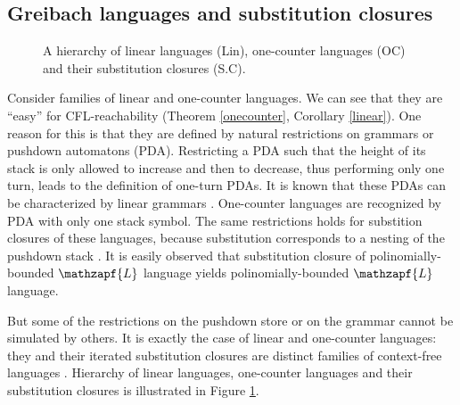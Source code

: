 \subsection{Greibach languages and substitution closures}
\begin{figure}
\centering
{}
\caption{A hierarchy of linear languages (Lin), one-counter languages (OC) and their substitution closures (S.C).}
\label{hierarchy}      
\end{figure}
Consider families of linear and one-counter languages. We can see that they are ``easy'' for CFL-reachability (Theorem \ref{onecounter}, Corollary \ref{linear}). One reason for this is that they are defined by natural restrictions on grammars or pushdown automatons (PDA). Restricting a PDA such that the height of its stack is only allowed to increase and then to decrease, thus performing only one turn, leads to the definition of one-turn PDAs. It is known that these PDAs can be characterized by linear grammars \cite{KUTRIB20072152}. One-counter languages are recognized by PDA with only one stack symbol. The same restrictions holds for substition closures of these languages, because substitution corresponds to a nesting of the pushdown stack \cite{Ginsburg1975}. It is easily observed that substitution closure of polinomially-bounded $\mathzapf{L}$ language yields polinomially-bounded $\mathzapf{L}$ language. 


But some of the restrictions on the pushdown store or on the grammar cannot be simulated by others. It is exactly the case of linear and one-counter languages: they and their iterated substitution closures are distinct families of context-free languages \cite{BEAUQUIER198191}.
Hierarchy of linear languages, one-counter languages and their substitution closures is illustrated in Figure \ref{hierarchy}. 


